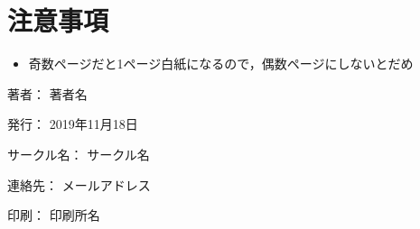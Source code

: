 \documentclass[
  xelatex,ja=standard, b5paper]{bxjsbook}
\providecommand{\tightlist}{%
  \setlength{\itemsep}{0pt}\setlength{\parskip}{0pt}}
\begin{document}
\hypertarget{caution}{%
\chapter{注意事項}\label{caution}}

\begin{itemize}
\tightlist
\item
  奇数ページだと1ページ白紙になるので，偶数ページにしないとだめ
\end{itemize}

\clearpage
{}
\begin{flushright}
\begin{minipage}{0.5\hsize}
\begin{description}
  \item{著者：} 著者名
  \item{発行：} 2019年11月18日
  \item{サークル名：} サークル名
  \item{連絡先：} メールアドレス
  \item{印刷：} 印刷所名
\end{description}
\end{minipage}
\end{flushright}
\clearpage
\end{document}
